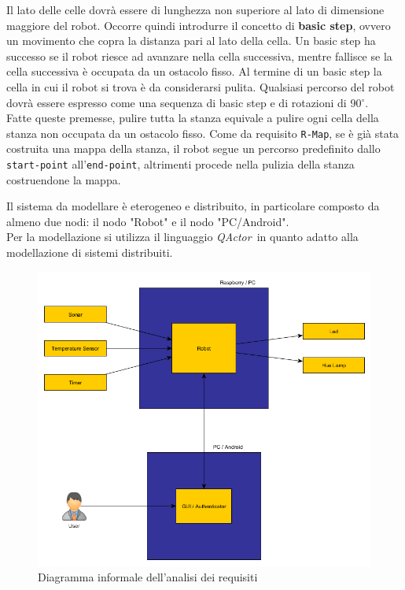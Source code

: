 \documentclass{llncs}
\newcommand{\code}[1]{{\color{blue}\small{\texttt{#1}}}}
\newcommand{\qa}{\textsf{\textit{QActor}}}
\begin{document}
Il lato delle celle dovrà essere di lunghezza non superiore al lato di dimensione maggiore del robot. Occorre quindi introdurre il concetto di \textbf{basic step}, ovvero un movimento che copra la distanza pari al lato della cella. Un basic step ha successo se il robot riesce ad avanzare nella cella successiva, mentre fallisce se la cella successiva è occupata da un ostacolo fisso. Al termine di un basic step la cella in cui il robot si trova è da considerarsi pulita. Qualsiasi percorso del robot dovrà essere espresso come una sequenza di basic step e di rotazioni di 90$^{\circ}$. \\ Fatte queste premesse, pulire tutta la stanza equivale a pulire ogni cella della stanza non occupata da un ostacolo fisso. Come da requisito \code{R-Map}, se è già stata costruita una mappa della stanza, il robot segue un percorso predefinito dallo \code{start-point} all'\code{end-point}, altrimenti procede nella pulizia della stanza costruendone la mappa. 

Il sistema da modellare è eterogeneo e distribuito, in particolare composto da almeno due nodi: il nodo "Robot" e il nodo "PC/Android". \\
Per la modellazione si utilizza il linguaggio \qa\ in quanto adatto alla modellazione di sistemi distribuiti. 

\begin{figure}[h]
	\centering
	\includegraphics[scale=0.4]{img/requirements_analysis.png}
	\caption{Diagramma informale dell'analisi dei requisiti}
	\label{fig:reqAnalysis}
\end{figure}
\end{document}
